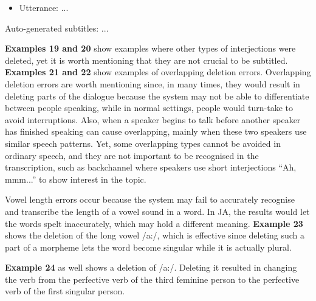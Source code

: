 \documentclass[english]{textolivre}
\newcommand{\ipa}[1]{{\ipafont #1}}
\begin{document}
\begin{itemize}
\item Utterance: ...
\end{itemize}

Auto-generated subtitles: ...

\textbf{Examples 19 and 20} show examples where other types of
interjections were deleted, yet it is worth mentioning that they are not
crucial to be subtitled. \textbf{Examples 21 and 22} show examples of
overlapping deletion errors. Overlapping deletion errors are worth
mentioning since, in many times, they would result in deleting parts of
the dialogue because the system may not be able to differentiate between
people speaking, while in normal settings, people would turn-take to
avoid interruptions. Also, when a speaker begins to talk before another
speaker has finished speaking can cause overlapping, mainly when these
two speakers use similar speech patterns. Yet, some overlapping types
cannot be avoided in ordinary speech, and they are not important to be
recognised in the transcription, such as backchannel where speakers use
short interjections ``Ah, mmm...'' to show interest in the topic.

Vowel length errors occur because the system may fail to accurately
recognise and transcribe the length of a vowel sound in a word. In JA,
the results would let the words spelt inaccurately, which may hold a
different meaning. \textbf{Example 23} shows the deletion of the long
vowel \ipa{/a:/}, which is effective since deleting such a part of a morpheme
lets the word become singular while it is actually plural.

\textbf{Example 24} as well shows a deletion of \ipa{/a:/}. Deleting it
resulted in changing the verb from the perfective verb of the third
feminine person to the perfective verb of the first singular person.
\end{document}
